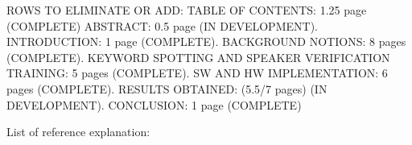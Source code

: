 ROWS TO ELIMINATE OR ADD:\newline\newline
TABLE OF CONTENTS: 1.25 page (COMPLETE)\newline
ABSTRACT: 0.5 page (IN DEVELOPMENT). INTRODUCTION: 1 page (COMPLETE). BACKGROUND NOTIONS: 8 pages (COMPLETE). KEYWORD SPOTTING AND SPEAKER VERIFICATION TRAINING: 5 pages (COMPLETE). SW AND HW IMPLEMENTATION: 6 pages (COMPLETE). RESULTS OBTAINED: (5.5/7 pages) (IN DEVELOPMENT). CONCLUSION: 1 page (COMPLETE)\newline
{} %
List of reference explanation:\newline
